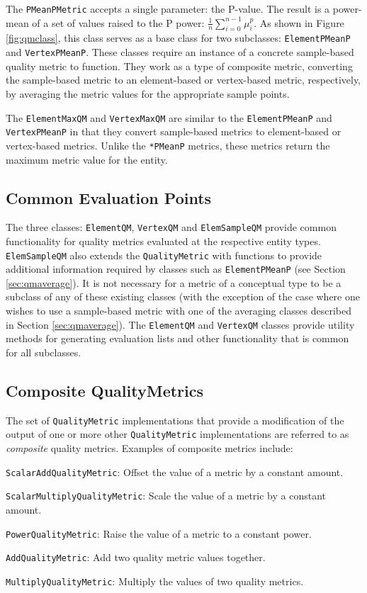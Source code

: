 \documentclass{article}
\begin{document}
The \texttt{PMeanPMetric} accepts a single parameter: the P-value.  The result is a power-mean of a set of values raised to the P power: $\frac{1}{n}\sum_{i=0}^{n-1}\mu_i^p$.  As shown in Figure \ref{fig:qmclass}, this class serves as a base class for two subclasses: \texttt{ElementPMeanP} and \texttt{VertexPMeanP}.  These classes require an instance of a concrete sample-based quality metric to function.  They work as a type of composite metric, converting the sample-based metric to an element-based or vertex-based metric, respectively, by averaging the metric values for the appropriate sample points. 

The \texttt{ElementMaxQM} and \texttt{VertexMaxQM} are similar to the \texttt{ElementPMeanP} and \texttt{VertexPMeanP} in that they convert sample-based metrics to element-based or vertex-based metrics.  Unlike the \texttt{*PMeanP} metrics, these metrics return the maximum metric value for the entity.  

\subsection{Common Evaluation Points}

The three classes: \texttt{ElementQM}, \texttt{VertexQM} and \texttt{ElemSampleQM} provide common functionality for quality metrics evaluated at the respective entity types.  \texttt{ElemSampleQM} also extends the \texttt{QualityMetric} with functions to provide additional information required by classes such as \texttt{ElementPMeanP} (see Section \ref{sec:qmaverage}).  It is not necessary for a metric of a conceptual type to be a subclass of any of these existing classes (with the exception of the case where one wishes to use a sample-based metric with one of the averaging classes described in Section \ref{sec:qmaverage}).  The \texttt{ElementQM} and \texttt{VertexQM} classes provide utility methods for generating evaluation lists and other functionality that is common for all subclasses.

\subsection{Composite QualityMetrics}

The set of \texttt{QualityMetric} implementations that provide a modification of the output of one or more other \texttt{QualityMetric} implementations are referred to as \emph{composite} quality metrics.  Examples of composite metrics include:
\begin{description}
\item{\texttt{ScalarAddQualityMetric}}: Offset the value of a metric by a constant amount.
\item{\texttt{ScalarMultiplyQualityMetric}}: Scale the value of a metric by a constant amount.
\item{\texttt{PowerQualityMetric}}: Raise the value of a metric to a constant power.
\item{\texttt{AddQualityMetric}}: Add two quality metric values together.
\item{\texttt{MultiplyQualityMetric}}: Multiply the values of two quality metrics.
\end{description}
\end{document}

